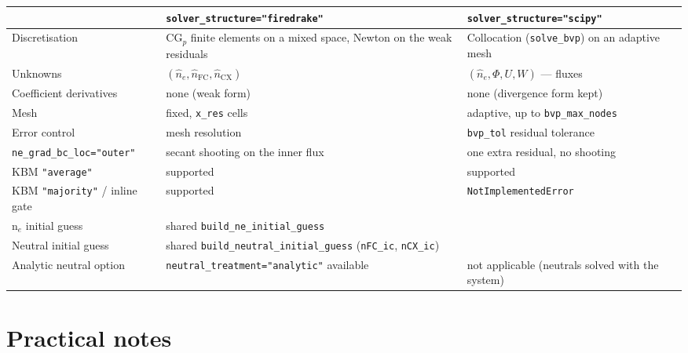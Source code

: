 \documentclass[11pt]{article}
\newcommand{\hn}{\hat{n}}
\newcommand{\code}[1]{\texttt{#1}}
\begin{document}
\begin{center}
\renewcommand{\arraystretch}{1.2}
\begin{tabular}{@{}p{}p{}p{}@{}}
\toprule
& \code{solver\_structure="firedrake"} & \code{solver\_structure="scipy"} \\
\midrule
Discretisation & CG$_p$ finite elements on a mixed space, Newton on the
weak residuals & Collocation (\code{solve\_bvp}) on an adaptive mesh \\
Unknowns & $(\hn_e, \hn_{\mathrm{FC}}, \hn_{\mathrm{CX}})$ &
$(\hn_e, \Phi, U, W)$ --- fluxes \\
Coefficient derivatives & none (weak form) & none (divergence form kept) \\
Mesh & fixed, \code{x\_res} cells & adaptive, up to \code{bvp\_max\_nodes} \\
Error control & mesh resolution & \code{bvp\_tol} residual tolerance \\
\code{ne\_grad\_bc\_loc="outer"} & secant shooting on the inner flux &
one extra residual, no shooting \\
KBM \code{"average"} & supported & supported \\
KBM \code{"majority"} / inline gate & supported & \code{NotImplementedError} \\
n$_e$ initial guess & \multicolumn{2}{l}{shared
\code{build\_ne\_initial\_guess}} \\
Neutral initial guess & \multicolumn{2}{l}{shared
\code{build\_neutral\_initial\_guess} (\code{nFC\_ic}, \code{nCX\_ic})} \\
Analytic neutral option & \code{neutral\_treatment="analytic"} available &
not applicable (neutrals solved with the system) \\
\bottomrule
\end{tabular}
\end{center}

\section{Practical notes}
\end{document}
